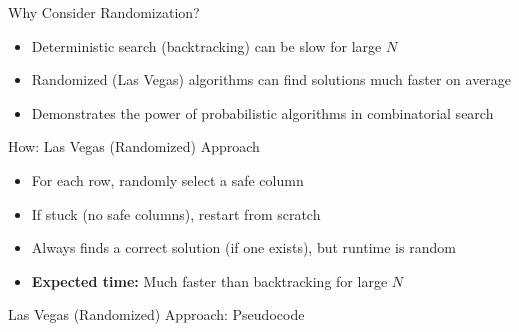\begin{frame}{Why Consider Randomization?}
  \begin{itemize}
    \item Deterministic search (backtracking) can be slow for large $N$
    \item Randomized (Las Vegas) algorithms can find solutions much faster on average
    \item Demonstrates the power of probabilistic algorithms in combinatorial search
  \end{itemize}
\end{frame}

\begin{frame}{How: Las Vegas (Randomized) Approach}
  \begin{itemize}
    \item For each row, randomly select a safe column
    \item If stuck (no safe columns), restart from scratch
    \item Always finds a correct solution (if one exists), but runtime is random
    \item \textbf{Expected time:} Much faster than backtracking for large $N$
  \end{itemize}
\end{frame}

\begin{frame}[fragile]{Las Vegas (Randomized) Approach: Pseudocode}
  \scriptsize
  \begin{algorithm}[H]
  \end{algorithm}
\end{frame}

